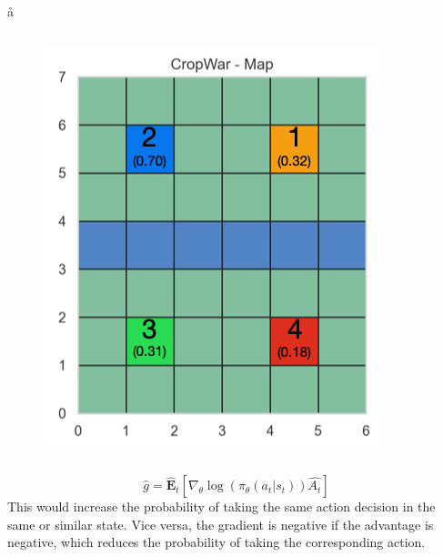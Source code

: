 \begin{frame}{\aa}{\aab}
    \begin{columns}
      \centering
      \begin{figure}
        \includegraphics[width=.8\textwidth]{Figures/v12_Map_start.png}
       \end{figure}
      \centering
    \end{columns}
  \end{frame}






  \begin{frame}{\ab}{\abb}
    \begin{equation}
      \hat{g} = \hat{\mathbf{E}}_t \left[ \nabla_{\theta} \log(\pi_{\theta}(a_t|s_t)) \hat{A_t} \right]
    \end{equation}
    This would increase the probability of taking the same action decision in the same or similar state. Vice versa, the gradient is negative if the advantage is negative, which reduces the probability of taking the corresponding action.
    \end{frame}